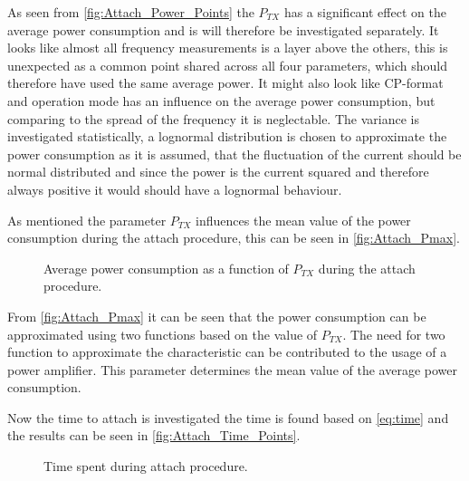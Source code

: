 As seen from \autoref{fig:Attach_Power_Points} the $P_{TX}$ has a significant effect on the average power consumption and is will therefore be investigated separately. It looks like almost all frequency measurements is a layer above the others, this is unexpected as a common point shared across all four parameters, which should therefore have used the same average power. It might also look like CP-format and operation mode has an influence on the average power consumption, but comparing to the spread of the frequency it is neglectable. The variance is investigated statistically, a lognormal distribution is chosen to approximate the power consumption as it is assumed, that the fluctuation of the current should be normal distributed and since the power is the current squared and therefore always positive it would should have a lognormal behaviour.  

As mentioned the parameter $P_{TX}$ influences the mean value of the power consumption during the attach procedure, this can be seen in \autoref{fig:Attach_Pmax}. 

\begin{figure}[H]
\centering
{}
\resizebox{0.7\textwidth}{!}{
}
\caption{Average power consumption as a function of $P_{TX}$ during the attach procedure.}
\label{fig:Attach_Pmax}
\end{figure}

From \autoref{fig:Attach_Pmax} it can be seen that the power consumption can be approximated using two functions based on the value of $P_{TX}$. The need for two function to approximate the characteristic can be contributed to the usage of a power amplifier. This parameter determines the mean value of the average power consumption. 

Now the time to attach is investigated the time is found based on \autoref{eq:time} and the results can be seen in \autoref{fig:Attach_Time_Points}.


\begin{figure}[H]
\centering
\begin{minipage}{0.48\textwidth}
\resizebox{\textwidth}{!}{
}
\end{minipage}
\hfill
\begin{minipage}{0.48\textwidth}
\resizebox{\textwidth}{!}{
}
\end{minipage}
\caption{Time spent during attach procedure.}
\label{fig:Attach_Time_Points}
\end{figure}

